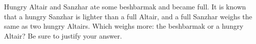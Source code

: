 Hungry Altair and Sanzhar ate some beshbarmak and became full. It is known that a hungry Sanzhar is lighter than a full Altair, and a full Sanzhar weighs the same as two hungry Altairs. Which weighs more: the beshbarmak or a hungry Altair? Be sure to justify your answer.

